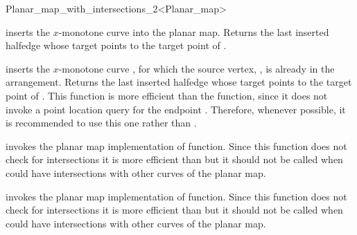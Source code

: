\begin{ccRefClass}{Planar_map_with_intersections_2<Planar_map>}
\ccOperations


      {inserts the $x$-monotone curve  into the planar map.
      Returns the last inserted halfedge whose target points to the
      target point of .
       }


      {inserts  the $x$-monotone curve , for
       which the source vertex, , is already in the
       arrangement.
       Returns the last inserted halfedge whose target points to the
       target point of .
       This function is more efficient than the  function,
       since it does not invoke a point location query for the
       endpoint . Therefore,
       whenever possible, it is recommended to use this one rather
       than .
       }

\begin{ccAdvanced}

  {invokes the planar map implementation of
   function. Since this function does not
  check for intersections it is more efficient than  but
  it should not be called when  could have intersections with other
  curves of the planar map.
       }

  {invokes the planar map implementation of
   function. Since this function does not
  check for intersections it is more efficient than  but
  it should not be called when  could have intersections with other
  curves of the planar map.
  }


\end{ccAdvanced}



\end{ccRefClass}
